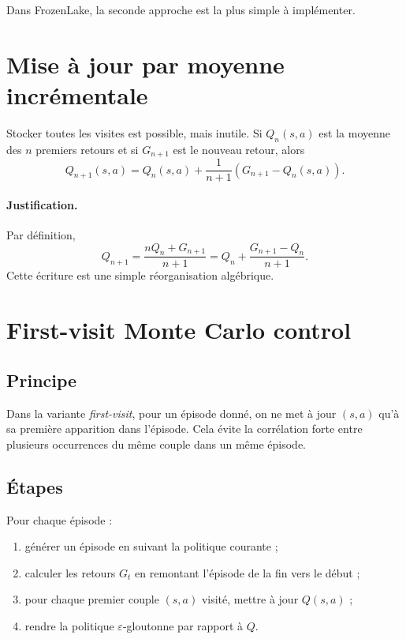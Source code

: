 \documentclass[11pt,a4paper]{article}
\begin{document}
Dans FrozenLake, la seconde approche est la plus simple à implémenter.

\section{Mise à jour par moyenne incrémentale}

Stocker toutes les visites est possible, mais inutile. Si $Q_n(s,a)$ est la moyenne des $n$ premiers retours et si $G_{n+1}$ est le nouveau retour, alors
\[
Q_{n+1}(s,a)=Q_n(s,a)+\frac{1}{n+1}\left(G_{n+1}-Q_n(s,a)\right).
\]

\paragraph{Justification.}
Par définition,
\[
Q_{n+1}=\frac{nQ_n+G_{n+1}}{n+1}
=Q_n+\frac{G_{n+1}-Q_n}{n+1}.
\]
Cette écriture est une simple réorganisation algébrique.

\section{First-visit Monte Carlo control}

\subsection{Principe}

Dans la variante \emph{first-visit}, pour un épisode donné, on ne met à jour $(s,a)$ qu'à sa première apparition dans l'épisode. Cela évite la corrélation forte entre plusieurs occurrences du même couple dans un même épisode.

\subsection{Étapes}

Pour chaque épisode :
\begin{enumerate}[leftmargin=1.6em]
    \item générer un épisode en suivant la politique courante ;
    \item calculer les retours $G_t$ en remontant l'épisode de la fin vers le début ;
    \item pour chaque premier couple $(s,a)$ visité, mettre à jour $Q(s,a)$ ;
    \item rendre la politique $\varepsilon$-gloutonne par rapport à $Q$.
\end{enumerate}
\end{document}
